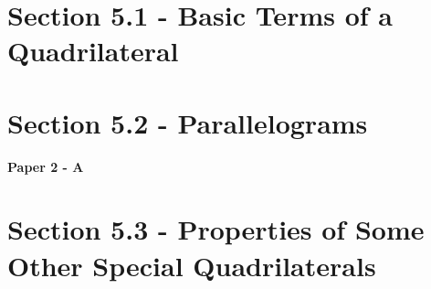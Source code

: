 \documentclass[12pt, a4paper]{article}
\begin{document}
\section*{Section 5.1 - Basic Terms of a Quadrilateral}\label{section:3-5-1}





\section*{Section 5.2 - Parallelograms}\label{section:3-5-2}

\textbf{Paper 2 - A}
\begin{enumx}[label=\arabic*.,start=1]
\item {}\label{DSE2012S-CoreP2-Q18} 
\item {}\label{DSE2012-CoreP2-Q17} 
\item {}\label{DSE2015-CoreP2-Q17} 
\item {}\label{DSE2016-CoreP2-Q17} 
\item {}\label{DSE2017-CoreP2-Q16} 
\item {}\label{DSE2017-CoreP2-Q20} 
\item {}\label{DSE2018-CoreP2-Q16} 
\item {}\label{DSE2019-CoreP2-Q16} 
\end{enumx}




\section*{Section 5.3 - Properties of Some Other Special Quadrilaterals}\label{section:3-5-3}
\end{document}
